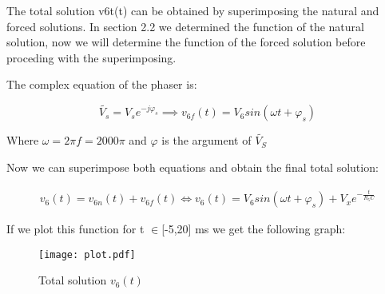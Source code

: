 \hspace{12pt} The total solution v6t(t) can be obtained by superimposing the natural and forced solutions. In section 2.2 we determined the function of the natural solution, now we will determine the function of the forced solution before proceding with the superimposing. 

The complex equation of the phaser is:

\begin{equation}
	\widetilde{V_s}=V_se^{-j\varphi_s} \implies v_{6f}(t)=V_6sin(\omega t+\varphi_s)
\end{equation}

Where $\omega=2\pi f=2000\pi$ and $\varphi$ is the argument of $\widetilde{V_S}$

\vspace{20pt}

Now we can superimpose both equations and obtain the final total solution:

\begin{gather}
	v_6(t)=v_{6n}(t)+v_{6f}(t) \iff v_6(t)=V_6sin(\omega t+\varphi_s)+V_xe^{-\frac{t}{R_5C}}
\end{gather}

If we plot this function for t $\in$[-5,20] ms we get the following graph:

\begin{figure}[h]
	\centering
	\texttt{[image: plot.pdf]}
	\caption{Total solution $v_6(t)$}
	\label{fig:total}
\end{figure}

\newpage
